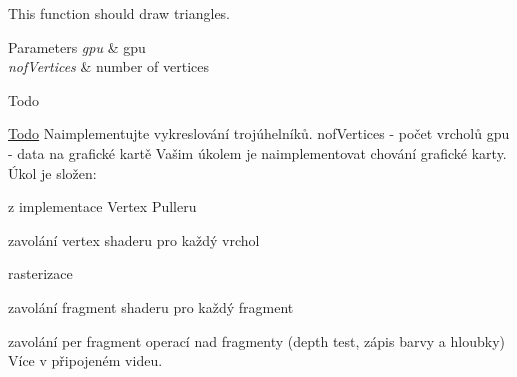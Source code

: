 This function should draw triangles. 


\begin{DoxyParams}{Parameters}
{\em gpu} & gpu \\
\hline
{\em nof\+Vertices} & number of vertices \\
\hline
\end{DoxyParams}
\begin{DoxyRefDesc}{Todo}
\item[\hyperlink{todo__todo000001}{Todo}]Naimplementujte vykreslování trojúhelníků. nof\+Vertices -\/ počet vrcholů gpu -\/ data na grafické kartě Vašim úkolem je naimplementovat chování grafické karty. Úkol je složen\+:
\begin{DoxyEnumerate}
\item z implementace Vertex Pulleru
\item zavolání vertex shaderu pro každý vrchol
\item rasterizace
\item zavolání fragment shaderu pro každý fragment
\item zavolání per fragment operací nad fragmenty (depth test, zápis barvy a hloubky) Více v připojeném videu. 
\end{DoxyEnumerate}\end{DoxyRefDesc}
